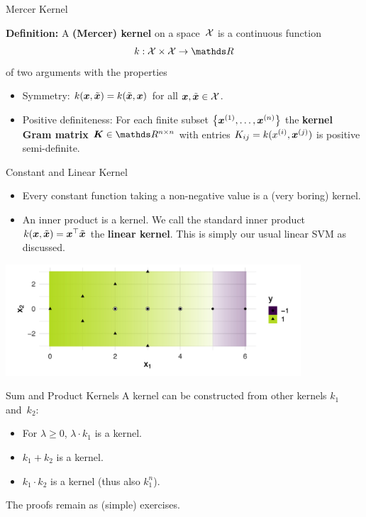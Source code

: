 \begin{vbframe}{Mercer Kernel}


  \textbf{Definition:} A \textbf{(Mercer) kernel} on a space~$\mathcal{X}$ is a
  continuous function
  $$ k : \Xspace \times \Xspace \to \R $$
  of two arguments with the properties
  \begin{itemize}
    \item Symmetry: $k(\bm{x}, \tilde {\bm{x}}) = k(\tilde {\bm{x}}, \bm{x})$ for all
    $\bm{x}, \tilde {\bm{x}} \in \mathcal{X}$.
    \item Positive definiteness: For each finite subset $\left\{\bm{x}^{(1)}, \dots, \bm{x}^{(n)}\right\}$
    the \textbf{kernel Gram matrix} $\bm{K} \in \R^{n \times n}$ with entries
    $K_{ij} = k(x^{(i)}, \bm{x}^{(j)})$ is positive semi-definite.
  \end{itemize}

\end{vbframe}

\begin{vbframe}{Constant and Linear Kernel}

  \begin{itemize}
    \item Every constant function taking a non-negative value is a
    (very boring) kernel.
    \item An inner product is a kernel.
    We call the standard inner product $k(\bm{x}, \tilde {\bm{x}}) = \bm{x}^\top \tilde {\bm{x}}$
    the \textbf{linear kernel}. This is simply our usual linear SVM as discussed.
  \end{itemize}
  

\begin{center}
\includegraphics[width = 11cm ]{figure_man/linear_kernel.png}
\end{center}

\end{vbframe}

\begin{vbframe}{Sum and Product Kernels}
    A kernel can be constructed from other kernels $k_1$ and~$k_2$:
  \begin{itemize}
      \item For $\lambda \geq 0$, $\lambda \cdot k_1$ is a kernel.
      \item $k_1 + k_2$ is a kernel.
      \item $k_1 \cdot k_2$ is a kernel (thus also $k_1^n$).
    \end{itemize}
    
    \lz

    The proofs remain as (simple) exercises.
\end{vbframe}

